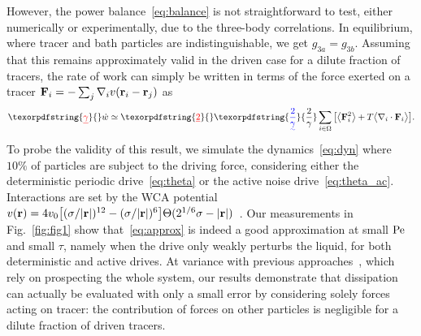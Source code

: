 \documentclass[superscriptaddress, twocolumn, prx, longbibliography, nofootinbib]{revtex4-1}
\providecommand{\DIFaddtex}[1]{{\protect\color{blue}\uwave{#1}}} %
\providecommand{\DIFdeltex}[1]{{\protect\color{red}\sout{#1}}}                      %
\providecommand{\DIFaddbegin}{} %
\providecommand{\DIFaddend}{} %
\providecommand{\DIFdelbegin}{} %
\providecommand{\DIFdelend}{} %
\providecommand{\DIFadd}[1]{\texorpdfstring{\DIFaddtex{#1}}{#1}} %
\providecommand{\DIFdel}[1]{\texorpdfstring{\DIFdeltex{#1}}{}} %
\begin{document}
However, the power balance~\eqref{eq:balance} is not straightforward to test, either numerically or experimentally, due to the three-body correlations. In equilibrium, where tracer and bath particles are indistinguishable, we get $g_{3a}=g_{3b}$. Assuming that this remains approximately valid in the driven case for a dilute fraction of tracers, the rate of work can simply be written in terms of the force exerted on a tracer ${\bf F}_i =- \sum_j\nabla_iv({\bf r}_i-{\bf r}_j)$ as
\begin{equation}\label{eq:approx}
	\DIFdelbegin \DIFdel{\gamma}\DIFdelend \dot w \simeq \DIFdelbegin \DIFdel{2}\DIFdelend \DIFaddbegin \DIFadd{\frac{2}{\gamma}}\DIFaddend \sum_{i\in\Omega} \big[ \big\langle{\bf F}_i^2\big\rangle + T \big\langle\nabla_i\cdot{\bf F}_i\big\rangle \big] .
\end{equation}
To probe the validity of this result, we simulate the dynamics~\eqref{eq:dyn} where $10\%$ of particles are subject to the driving force, considering either the deterministic periodic drive~\eqref{eq:theta} or the active noise drive~\eqref{eq:theta_ac}. Interactions are set by the WCA potential $v({\bf r})=4v_0\big[(\sigma/|{\bf r}|)^{12}-(\sigma/|{\bf r}|)^6\big]\Theta(2^{1/6}\sigma-|{\bf r}|)$~\cite{WCA1971}. Our measurements in Fig.~\ref{fig:fig1} show that~\eqref{eq:approx} is indeed a good approximation at small $\rm Pe$ and small $\tau$, namely when the drive only weakly perturbs the liquid, for both deterministic and active drives. At variance with previous approaches~\cite{Harada2005, Lander2012, Battle604}, which rely on prospecting the whole system, our results demonstrate that dissipation can actually be evaluated with only a small error by considering solely forces acting on tracer: the contribution of forces on other particles is negligible for a dilute fraction of driven tracers.
\end{document}
